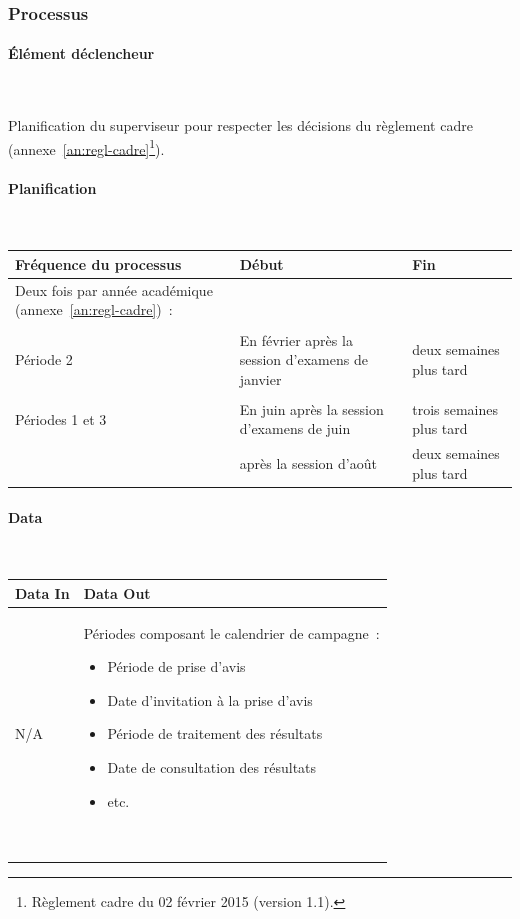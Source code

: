 \documentclass[a4paper,11pt]{report}
\begin{document}
\subsubsection{Processus}
\paragraph{Élément déclencheur}~\newline{}

Planification du superviseur pour respecter les décisions du règlement cadre (annexe~\ref{an:regl-cadre}\footnote{Règlement cadre du 02 février 2015 (version 1.1).}).

\paragraph{Planification}~\newline{}

\begin{tabularx}{\linewidth}{|X|X|X|} \hline
Fréquence du processus & Début & Fin \\ \hline
Deux fois par année académique (annexe~\ref{an:regl-cadre})~: & & \\
& & \\
Période 2 & En février après la session d'examens de janvier & deux semaines plus tard \\
& & \\ %
Périodes 1 et 3 & En juin après la session d'examens de juin & trois semaines plus tard \\
& après la session d'août & deux semaines plus tard \\ \hline
\end{tabularx}

\paragraph{Data}~\newline{}

\begin{tabularx}{\linewidth}{|X|X|} \hline
Data In & Data Out \\ \hline
N/A & Périodes composant le calendrier de campagne~:
\begin{itemize}
	\item Période de prise d'avis
	\item Date d'invitation à la prise d'avis
	\item Période de traitement des résultats
	\item Date de consultation des résultats
	\item etc.
\end{itemize}
~\\ \hline
\end{tabularx}
\end{document}
